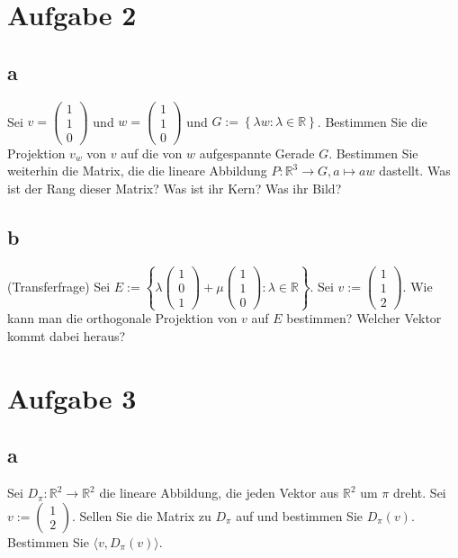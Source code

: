 \section{Aufgabe 2}

\subsection{a}
Sei $v = \begin{pmatrix}
    1 \\ 1 \\ 0
\end{pmatrix}$ und $w = \begin{pmatrix}
    1 \\ 1 \\ 0
\end{pmatrix}$ und $G := \left\{\lambda w: \lambda \in \mathbb{R}\right\}$. Bestimmen Sie die Projektion $v_w$ von 
$v$ auf die von $w$ aufgespannte Gerade $G$.
Bestimmen Sie weiterhin die Matrix, die die lineare Abbildung $P: \mathbb{R}^3 \rightarrow G, a \mapsto aw$ dastellt. 
Was ist der Rang dieser Matrix? Was ist ihr Kern? Was ihr Bild?

\subsection{b}
(Transferfrage) Sei $E := \left\{\lambda\begin{pmatrix}
    1 \\ 0 \\ 1
\end{pmatrix} + \mu \begin{pmatrix}
    1 \\ 1 \\ 0
\end{pmatrix}: \lambda \in \mathbb{R}\right\}$. Sei $v := \begin{pmatrix}
    1 \\ 1 \\ 2
\end{pmatrix}$. Wie kann man die orthogonale Projektion von $v$ auf $E$ bestimmen? Welcher Vektor kommt dabei heraus?

\section{Aufgabe 3}

\subsection{a}
Sei $D_\pi: \mathbb{R}^2 \rightarrow \mathbb{R}^2$ die lineare Abbildung, die jeden Vektor aus $\mathbb{R}^2$ um 
$\pi$ dreht. Sei $v := \begin{pmatrix}1 \\2\end{pmatrix}$. Sellen Sie die Matrix zu $D_\pi$ auf und bestimmen Sie 
$D_\pi(v)$. Bestimmen Sie $\langle v, D_\pi(v)\rangle$.

